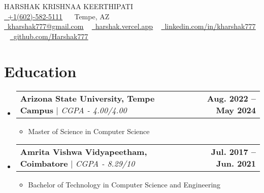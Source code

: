 \documentclass[letterpaper,11pt]{article}
\makeatletter
\newcommand{\resumeItem}[1]{
  \item\small{
    {#1 \vspace{-2pt}}
  }
}
\newcommand{\resumeEducationHeading}[2]{
    \item\vspace{-4pt}
    \begin{tabular*}{1.001\textwidth}{l@{\extracolsep{\fill}}r}
      \small#1 & \textbf{\small #2}\\
    \end{tabular*}\vspace{-7pt}
}
\newcommand{\resumeSubHeadingListStart}{\begin{itemize}[leftmargin=0.0in, label={}]}
\newcommand{\resumeSubHeadingListEnd}{\end{itemize}}
\newcommand{\resumeItemListStart}{\begin{itemize}}
\newcommand{\resumeItemListEndESpace}{\end{itemize}\vspace{-8pt}}
\newcommand{\resumeItemListEndLessSpace}{\end{itemize}\vspace{-20pt}}
\makeatother
\begin{document}

\begin{center}
    {\Huge \scshape HARSHAK KRISHNAA KEERTHIPATI} \\ \vspace{1pt}
    \href{tel:+1(602)-582-5111}{\raisebox{-0.2\height}\ \underline{+1(602)-582-5111}} ~
    \raisebox{-0.2\height}\ Tempe, AZ \\ \vspace{1pt}
    \href{mailto:kharshak777@gmail.com}{\raisebox{-0.2\height}\ \underline{kharshak777@gmail.com}} ~ 
    \href{https://harshak.vercel.app}{\raisebox{-0.2\height}\ \underline{harshak.vercel.app}} ~
    \href{https://linkedin.com/in/kharshak777/}{\raisebox{-0.2\height}\ \underline{linkedin.com/in/kharshak777}}  ~
    \href{https://github.com/Harshak777}{\raisebox{-0.2\height}\ \underline{github.com/Harshak777}} ~
    \vspace{-8pt}
\end{center}

\section{Education}
  \resumeSubHeadingListStart
    \resumeEducationHeading
          {\textbf{Arizona State University, Tempe Campus} $|$ \emph{CGPA - 4.00/4.00}}{Aug. 2022 -- May 2024}
          \resumeItemListStart
            \resumeItem{Master of Science in Computer Science}
          \resumeItemListEndLessSpace
    \resumeEducationHeading
          {\textbf{Amrita Vishwa Vidyapeetham, Coimbatore} $|$ \emph{CGPA - 8.29/10}}{Jul. 2017 -- Jun. 2021}
          \resumeItemListStart
            \resumeItem{Bachelor of Technology in Computer Science and Engineering}
          \resumeItemListEndESpace
  \resumeSubHeadingListEnd
\end{document}
